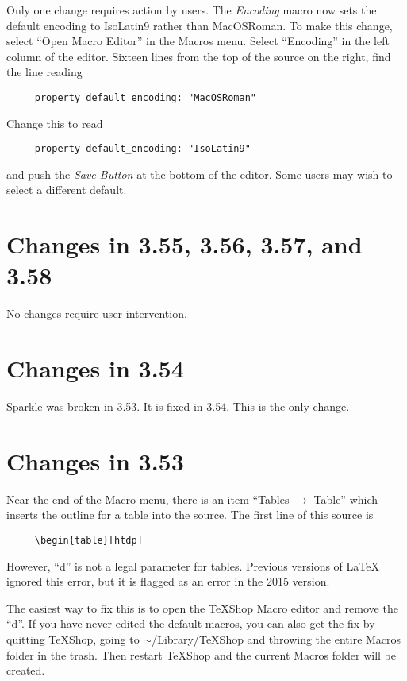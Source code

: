 \documentclass[11pt, oneside]{amsart}
\begin{document}
Only one change requires  action by users. The {\em Encoding} macro now sets the default encoding to IsoLatin9 rather than MacOSRoman. To make this change, 
select ``Open Macro Editor'' in the Macros menu. Select ``Encoding'' in the left column of the editor. Sixteen lines from the top of the source on the right, find the line reading
\begin{verbatim}
     property default_encoding: "MacOSRoman"
\end{verbatim}
Change this to read
\begin{verbatim}
     property default_encoding: "IsoLatin9"
\end{verbatim}
and push the {\em Save Button} at the bottom of the editor. Some users may wish to select a different default.


\section{Changes in 3.55, 3.56, 3.57, and 3.58}

No changes require user intervention.

\section{Changes in 3.54}

Sparkle was broken in 3.53. It is fixed in 3.54. This is the only change.

\section{Changes in 3.53}

Near the end of the Macro menu, there is an item ``Tables $\rightarrow$ Table'' which inserts the
outline for a table into the source. The first line of this source is 
\begin{verbatim}
     \begin{table}[htdp]
\end{verbatim}

However, ``d'' is not a legal parameter for tables. Previous versions of LaTeX ignored this error, but it is flagged as an error in the 2015 version. 

The easiest way to fix this is to open the TeXShop Macro editor and remove the ``d''. If you have never edited the default macros,
you can also get the fix by quitting TeXShop, going to $\sim$/Library/TeXShop and
throwing the entire Macros folder in the trash. Then restart TeXShop and the current
Macros folder will be created.
\end{document}
